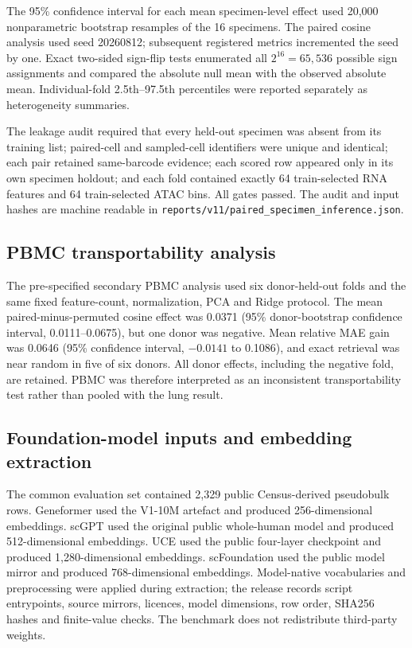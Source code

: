 \documentclass[11pt]{article}
\begin{document}
The 95\% confidence interval for each mean specimen-level effect used 20,000 nonparametric bootstrap resamples of the 16 specimens. The paired cosine analysis used seed 20260812; subsequent registered metrics incremented the seed by one. Exact two-sided sign-flip tests enumerated all $2^{16}=65,536$ possible sign assignments and compared the absolute null mean with the observed absolute mean. Individual-fold 2.5th--97.5th percentiles were reported separately as heterogeneity summaries.

The leakage audit required that every held-out specimen was absent from its training list; paired-cell and sampled-cell identifiers were unique and identical; each pair retained same-barcode evidence; each scored row appeared only in its own specimen holdout; and each fold contained exactly 64 train-selected RNA features and 64 train-selected ATAC bins. All gates passed. The audit and input hashes are machine readable in \texttt{reports/v11/paired\_specimen\_inference.json}.

\subsection*{PBMC transportability analysis}

The pre-specified secondary PBMC analysis used six donor-held-out folds and the same fixed feature-count, normalization, PCA and Ridge protocol. The mean paired-minus-permuted cosine effect was 0.0371 (95\% donor-bootstrap confidence interval, 0.0111--0.0675), but one donor was negative. Mean relative MAE gain was 0.0646 (95\% confidence interval, $-0.0141$ to 0.1086), and exact retrieval was near random in five of six donors. All donor effects, including the negative fold, are retained. PBMC was therefore interpreted as an inconsistent transportability test rather than pooled with the lung result.

\subsection*{Foundation-model inputs and embedding extraction}

The common evaluation set contained 2,329 public Census-derived pseudobulk rows. Geneformer used the V1-10M artefact and produced 256-dimensional embeddings. scGPT used the original public whole-human model and produced 512-dimensional embeddings. UCE used the public four-layer checkpoint and produced 1,280-dimensional embeddings. scFoundation used the public model mirror and produced 768-dimensional embeddings. Model-native vocabularies and preprocessing were applied during extraction; the release records script entrypoints, source mirrors, licences, model dimensions, row order, SHA256 hashes and finite-value checks. The benchmark does not redistribute third-party weights.
\end{document}
